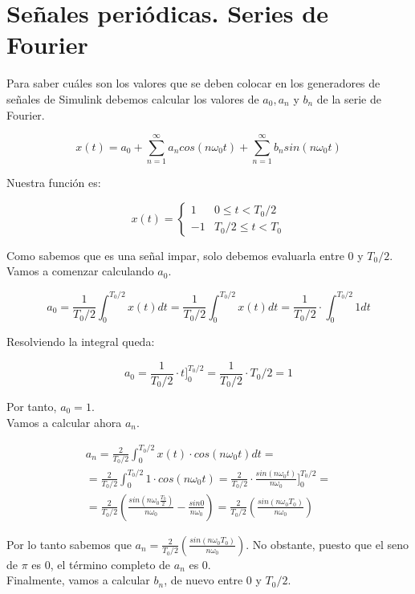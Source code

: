 \documentclass[11pt,a4paper]{article}
\begin{document}
\newpage

\section{Señales periódicas. Series de Fourier}

Para saber cuáles son los valores que se deben colocar en los generadores de señales de Simulink debemos calcular los valores de $a_0, a_n$ y $b_n$ de la serie de Fourier.

\[x(t)=a_0+ \sum_{n=1}^{\infty} a_n cos(n\omega_0 t) +\sum_{n=1}^{\infty} b_n sin(n\omega_0 t)  \]

Nuestra función es:

\[x(t)=\begin{cases} 
      1 & 0\leq t < T_0/2\\
      -1 & T_0/2 \leq t < T_0
   \end{cases}
\]

Como sabemos que es una señal impar, solo debemos evaluarla entre 0 y $T_0/2$. Vamos a comenzar calculando $a_0$.

\[
	a_0 = \frac{1}{T_0/2} \int_{0}^{T_0/2} x(t)dt  = \frac{1}{T_0/2} \int_{0}^{T_0/2} x(t)dt = \frac{1}{T_0/2}\cdot \int_{0}^{T_0/2}1dt
\]

Resolviendo la integral queda:

\[
	a_0 = \frac{1}{T_0/2}\cdot t\bigg]_{0}^{T_0/2} = \frac{1}{T_0/2}\cdot T_0/2 = 1
\]

Por tanto, $a_0 = 1$.\\

Vamos a calcular ahora $a_n$.

\begin{gather*}
	a_n = \frac{2}{T_0/2}\int_{0}^{T_0/2} x(t)\cdot cos(n\omega_0 t)dt = \\
	= \frac{2}{T_0/2}\int_{0}^{T_0/2} 1\cdot cos(n\omega_0 t) 
	= \frac{2}{T_0/2}\cdot \frac{sin(n\omega_0 t)}{n\omega_0}\bigg]_{0}^{T_0/2} = \\
	= \frac{2}{T_0/2}\left( \frac{sin(n\omega_0\frac{T_0}{2})}{n\omega_0} - \frac{sin 0}{n\omega_0}\right)
	= \frac{2}{T_0/2}\left( \frac{sin(n\omega_0T_0)}{n\omega_0} \right)
\end{gather*}

Por lo tanto sabemos que $a_n =  \frac{2}{T_0/2}\left( \frac{sin(n\omega_0T_0)}{n\omega_0} \right)$. No obstante, puesto que el seno de $\pi$ es 0, el término completo de $a_n$ es 0.\\

Finalmente, vamos a calcular $b_n$, de nuevo entre 0 y $T_0/2$.
\end{document}
